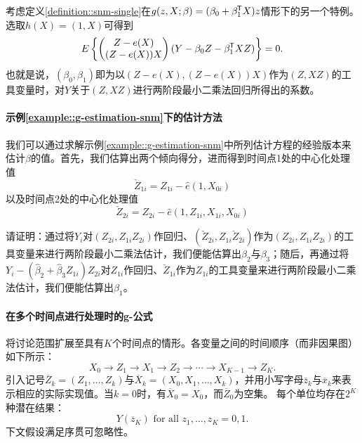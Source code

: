 考虑定义\ref{definition::snm-single}在$g(z,X;\beta) = (\beta_0 + \beta_1^{\mkern-1.5mu\mathsf{T}} X) z$情形下的另一个特例。选取$h(X) = (1,X)$可得到
$$
E\left\{   \begin{pmatrix}
Z-e(X)\\
(Z-e(X)) X
\end{pmatrix}  
(Y-  \beta_0 Z - \beta_1^{\mkern-1.5mu\mathsf{T}} XZ) \right\}  = 0.
$$
也就是说，$(\beta_0,\beta_1)$即为以$(Z-e(X),  (Z-e(X)) X )$作为$(Z, XZ)$的工具变量时，对$Y$关于$(Z, XZ)$进行两阶段最小二乘法回归所得出的系数。 



\paragraph{示例\ref{example::g-estimation-snm}下的估计方法}\label{problem::snm-estimation-example}
 

我们可以通过求解示例\ref{example::g-estimation-snm}中所列估计方程的经验版本来估计$\beta$的值。首先，我们估算出两个倾向得分，进而得到时间点1处的中心化处理值$$
\check{Z}_{1i} = Z_{1i} - \hat{e}(1,X_{0i})
$$以及时间点2处的中心化处理值$$
 \check{Z}_{2i} = Z_{2i}  - \hat{e}(1, Z_{1i}, X_{1i}, X_{0i})
 $$ 


请证明：通过将$Y_i$对$(Z_{2i}, Z_{1i} Z_{2i} )$作回归、$( \check{Z}_{2i} ,  Z_{1i}\check{Z}_{2i} )$作为$(Z_{2i}, Z_{1i} Z_{2i} )$的工具变量来进行两阶段最小二乘法估计，我们便能估算出$\beta_2$与$\beta_3$；随后，再通过将$Y_i - (\hat{\beta}_2+\hat{\beta}_3 Z_{1i}) Z_{2i}$对$Z_{1i}$作回归、$\check{Z}_{1i} $作为$Z_{1i}$的工具变量来进行两阶段最小二乘法估计，我们便能估算出$\beta_1$。
 
 
 
 
\paragraph{在多个时间点进行处理时的g-公式}\label{problem::g-formula-multiple-time}



将讨论范围扩展至具有$K$个时间点的情形。各变量之间的时间顺序（而非因果图）如下所示：
$$
X_0 \rightarrow Z_1 \rightarrow X_1 \rightarrow Z_2 \rightarrow \cdots  \rightarrow  X_{K-1}  \rightarrow Z_K .
$$
引入记号$\overline{Z}_k = (Z_1, \ldots, Z_k)$与$\overline{X}_k = (X_0, X_1, \ldots, X_k)$，并用小写字母$\overline{z}_k $与$\overline{x}_k$来表示相应的实际实现值。当$k=0$时，有$\overline{X}_0 = X_0$，而$\overline{Z}_0$为空集。
每个单位均存在$2^K$种潜在结果：
$$
Y(\overline{z}_K) \text{ for all } z_1,\ldots, z_K = 0,1.
$$
下文假设满足序贯可忽略性。

